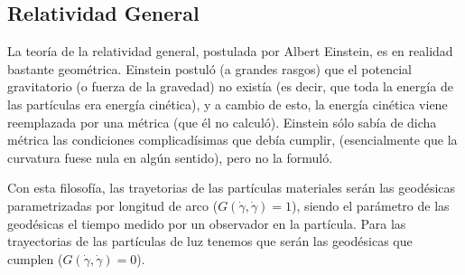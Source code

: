 \documentclass[palatino, bibnumbers]{apuntes}
\begin{document}
\subsection{Relatividad General}
La teoría de la relatividad general, postulada por Albert Einstein, es en realidad bastante geométrica. Einstein postuló (a grandes rasgos) que el potencial gravitatorio (o fuerza de la gravedad) no existía (es decir, que toda la energía de las partículas era energía cinética), y a cambio de esto, la energía cinética viene reemplazada por una métrica (que él no calculó). Einstein sólo sabía de dicha métrica las condiciones complicadísimas que debía cumplir, (esencialmente que la curvatura fuese nula en algún sentido), pero no la formuló.

\indent Con esta filosofía, las trayetorias de las partículas materiales serán las geodésicas parametrizadas por longitud de arco ($G(\dot{\gamma},\dot{\gamma})=1$), siendo el parámetro de las geodésicas el tiempo medido por un observador en la partícula.
Para las trayectorias de las partículas de luz tenemos que serán las geodésicas que cumplen ($G(\dot{\gamma},\dot{\gamma})=0$).
\end{document}
